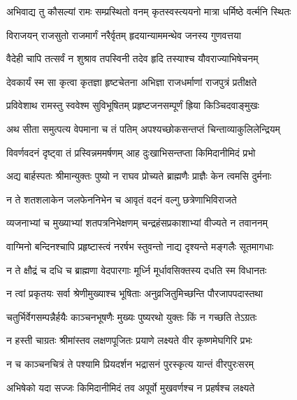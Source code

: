 \twolineshloka
{अभिवाद्य तु कौसल्यां रामः सम्प्रस्थितो वनम्}
{कृतस्वस्त्ययनो मात्रा धर्मिष्ठे वर्त्मनि स्थितः} %

\twolineshloka
{विराजयन् राजसुतो राजमार्गं नरैर्वृतम्}
{हृदयान्याममन्थेव जनस्य गुणवत्तया} %

\twolineshloka
{वैदेही चापि तत्सर्वं न शुश्राव तपस्विनी}
{तदेव हृदि तस्याश्च यौवराज्याभिषेचनम्} %

\twolineshloka
{देवकार्यं स्म सा कृत्वा कृतज्ञा हृष्टचेतना}
{अभिज्ञा राजधर्माणां राजपुत्रं प्रतीक्षते} %

\twolineshloka
{प्रविवेशाथ रामस्तु स्ववेश्म सुविभूषितम्}
{प्रहृष्टजनसम्पूर्णं ह्रिया किञ्चिदवाङ्मुखः} %

\twolineshloka
{अथ सीता समुत्पत्य वेपमाना च तं पतिम्}
{अपश्यच्छोकसन्तप्तं चिन्ताव्याकुलिलेन्द्रियम्} %

\twolineshloka
{विवर्णवदनं दृष्ट्वा तं प्रस्विन्नममर्षणम्}
{आह दुःखाभिसन्तप्ता किमिदानीमिदं प्रभो} %

\twolineshloka
{अद्य बार्हस्पतः श्रीमान्युक्तः पुष्यो न राघव}
{प्रोच्यते ब्राह्मणैः प्राज्ञैः केन त्वमसि दुर्मनाः} %

\twolineshloka
{न ते शतशलाकेन जलफेननिभेन च}
{आवृतं वदनं वल्गु छत्रेणाभिविराजते} %

\twolineshloka
{व्यजनाभ्यां च मुख्याभ्यां शतपत्रनिभेक्षणम्}
{चन्द्रहंसप्रकाशाभ्यां वीज्यते न तवाननम्} %

\twolineshloka
{वाग्मिनो बन्दिनश्चापि प्रहृष्टास्त्वं नरर्षभ}
{स्तुवन्तो नाद्य दृश्यन्ते मङ्गलैः सूतमागधाः} %

\twolineshloka
{न ते क्षौद्रं च दधि च ब्राह्मणा वेदपारगाः}
{मूर्ध्नि मूर्धावसिक्तस्य दधति स्म विधानतः} %

\twolineshloka
{न त्वां प्रकृतयः सर्वा श्रेणीमुख्याश्च भूषिताः}
{अनुव्रजितुमिच्छन्ति पौरजापपदास्तथा} %

\twolineshloka
{चतुर्भिर्वेगसम्पन्नैर्हयैः काञ्चनभूषणैः}
{मुख्यः पुष्यरथो युक्तः किं न गच्छति तेऽग्रतः} %

\twolineshloka
{न हस्ती चाग्रतः श्रीमांस्तव लक्षणपूजितः}
{प्रयाणे लक्ष्यते वीर कृष्णमेघगिरि प्रभः} %

\twolineshloka
{न च काञ्चनचित्रं ते पश्यामि प्रियदर्शन}
{भद्रासनं पुरस्कृत्य यान्तं वीरपुरःसरम्} %

\twolineshloka
{अभिषेको यदा सज्जः किमिदानीमिदं तव}
{अपूर्वो मुखवर्णश्च न प्रहर्षश्च लक्ष्यते} %

